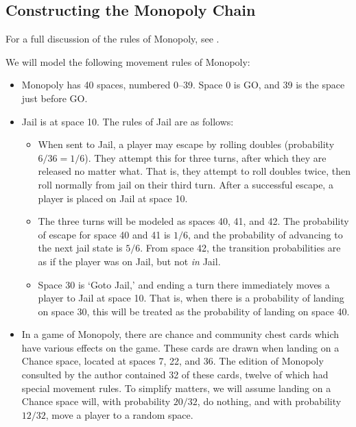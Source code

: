 \documentclass[12pt]{article}
\theoremstyle{definition}
\begin{document}
\subsection{Constructing the Monopoly Chain}
\label{sub:constructing_the_monopoly_chain}

For a full discussion of the rules of Monopoly, see \cite{wilding2006monopoly}.

We will model the following movement rules of Monopoly:

\begin{itemize}
    \item Monopoly has 40 spaces, numbered 0--39. Space 0 is GO, and 39 is the
    space just before GO.
    \item Jail is at space 10. The rules of Jail are as follows:
    \begin{itemize}
        \item When sent to Jail, a player may escape by rolling doubles
        (probability $6/36 = 1/6$). They attempt this for three turns, after
        which they are released no matter what. That is, they attempt to roll
        doubles twice, then roll normally from jail on their third turn. After
        a successful escape, a player is placed on Jail at space 10.

        \item The three turns will be modeled as spaces 40, 41, and 42. The
        probability of escape for space 40 and 41 is $1/6$, and the probability
        of advancing to the next jail state is $5/6$. From space 42, the
        transition probabilities are as if the player was on Jail, but not
        \emph{in} Jail.

        \item Space 30 is `Goto Jail,' and ending a turn there immediately
        moves a player to Jail at space 10. That is, when there is a
        probability of landing on space 30, this will be treated as the
        probability of landing on space 40.
    \end{itemize}

    \item In a game of Monopoly, there are chance and community chest cards
    which have various effects on the game. These cards are drawn when landing
    on a Chance space, located at spaces 7, 22, and 36. The edition of Monopoly
    consulted by the author contained 32 of these cards, twelve of which had
    special movement rules. To simplify matters, we will assume landing on a
    Chance space will, with probability $20/32$, do nothing, and with
    probability $12/32$, move a player to a random space.
    

\end{itemize}
\end{document}
